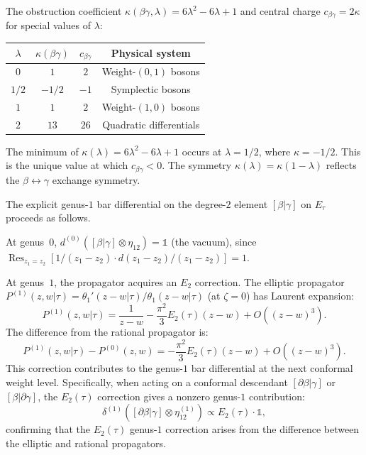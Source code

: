 \begin{computation}
\label{comp:betagamma-curvature-table}
The obstruction coefficient $\kappa(\beta\gamma,\lambda)
= 6\lambda^2 - 6\lambda + 1$ and central charge
$c_{\beta\gamma} = 2\kappa$ for special values of $\lambda$:

\begin{center}
\begin{tabular}{cccc}
\toprule
$\lambda$ & $\kappa(\beta\gamma)$ & $c_{\beta\gamma}$ & Physical system \\
\midrule
$0$ & $1$ & $2$ & Weight-$(0,1)$ bosons \\
$1/2$ & $-1/2$ & $-1$ & Symplectic bosons \\
$1$ & $1$ & $2$ & Weight-$(1,0)$ bosons \\
$2$ & $13$ & $26$ & Quadratic differentials \\
\bottomrule
\end{tabular}
\end{center}

The minimum of $\kappa(\lambda) = 6\lambda^2 - 6\lambda + 1$
occurs at $\lambda = 1/2$, where $\kappa = -1/2$.  This is the
unique value at which $c_{\beta\gamma} < 0$.  The symmetry
$\kappa(\lambda) = \kappa(1-\lambda)$ reflects the $\beta
\leftrightarrow \gamma$ exchange symmetry.
\end{computation}

\begin{computation}
\label{comp:betagamma-genus1-bar-deg2}
The explicit genus-$1$ bar differential on the degree-$2$ element
$[\beta|\gamma]$ on $E_\tau$ proceeds as follows.

At genus~$0$, $d^{(0)}([\beta|\gamma] \otimes \eta_{12}) = \mathbb{1}$
(the vacuum), since $\operatorname{Res}_{z_1=z_2}[1/(z_1-z_2) \cdot
d(z_1-z_2)/(z_1-z_2)] = 1$.

At genus~$1$, the propagator acquires an $E_2$ correction.
The elliptic propagator
$P^{(1)}(z,w|\tau) = \theta_1'(z-w|\tau)/\theta_1(z-w|\tau)$
(at $\zeta = 0$) has Laurent expansion:
\[
P^{(1)}(z,w|\tau)
= \frac{1}{z-w} - \frac{\pi^2}{3} E_2(\tau)(z-w) + O((z-w)^3).
\]
The difference from the rational propagator is:
\begin{equation}\label{eq:propagator-difference}
P^{(1)}(z,w|\tau) - P^{(0)}(z,w)
= -\frac{\pi^2}{3} E_2(\tau)(z-w) + O((z-w)^3).
\end{equation}
This correction contributes to the genus-$1$ bar differential at
the next conformal weight level.  Specifically, when acting on a
conformal descendant $[\partial\beta|\gamma]$ or $[\beta|\partial\gamma]$,
the $E_2(\tau)$ correction gives a nonzero genus-$1$ contribution:
\[
\delta^{(1)}([\partial\beta|\gamma] \otimes \eta_{12}^{(1)})
\propto E_2(\tau) \cdot \mathbb{1},
\]
confirming that the $E_2(\tau)$ genus-$1$ correction arises from
the difference between the elliptic and rational propagators.
\end{computation}


